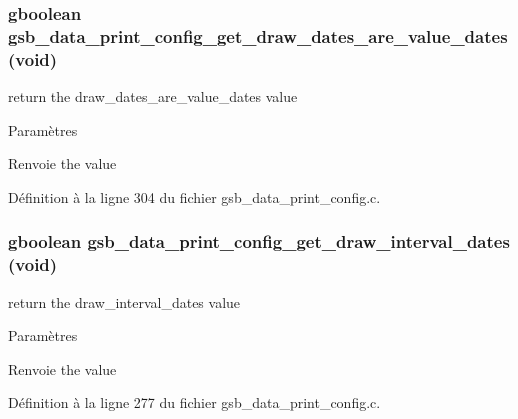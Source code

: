 \subsubsection[{gsb\_\-data\_\-print\_\-config\_\-get\_\-draw\_\-dates\_\-are\_\-value\_\-dates}]{\setlength{\rightskip}{0pt plus 5cm}gboolean gsb\_\-data\_\-print\_\-config\_\-get\_\-draw\_\-dates\_\-are\_\-value\_\-dates (void)}\label{gsb__data__print__config_8c_a533bc3e1fa5039645557a0d959571497}
return the draw\_\-dates\_\-are\_\-value\_\-dates value


\begin{DoxyParams}{Paramètres}
\item[{\em }]\end{DoxyParams}
\begin{DoxyReturn}{Renvoie}
the value 
\end{DoxyReturn}


Définition à la ligne 304 du fichier gsb\_\-data\_\-print\_\-config.c.

\subsubsection[{gsb\_\-data\_\-print\_\-config\_\-get\_\-draw\_\-interval\_\-dates}]{\setlength{\rightskip}{0pt plus 5cm}gboolean gsb\_\-data\_\-print\_\-config\_\-get\_\-draw\_\-interval\_\-dates (void)}\label{gsb__data__print__config_8c_a10c52e1083f665efc453c87daff007a7}
return the draw\_\-interval\_\-dates value


\begin{DoxyParams}{Paramètres}
\item[{\em }]\end{DoxyParams}
\begin{DoxyReturn}{Renvoie}
the value 
\end{DoxyReturn}


Définition à la ligne 277 du fichier gsb\_\-data\_\-print\_\-config.c.

